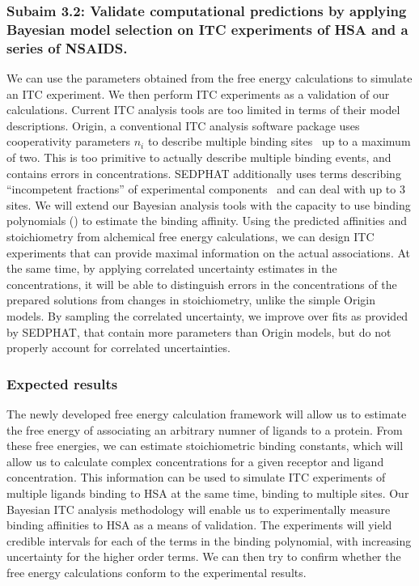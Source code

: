 \documentclass[10pt,final]{article}
\begin{document}
\subsubsection*{Subaim 3.2: Validate computational predictions by applying Bayesian model selection on ITC  experiments of HSA and a series of NSAIDS.}
We can use the parameters obtained from the free energy calculations to simulate an ITC experiment.
%
We then perform ITC experiments as a validation of our calculations.
%
Current ITC analysis tools are too limited in terms of their model descriptions.
%
Origin, a conventional ITC analysis software package uses cooperativity parameters $n_i$ to describe multiple binding sites~\autocite{MicroCal2004a} up to a maximum of two.
%
This is too primitive to actually describe multiple binding events, and contains errors in concentrations.
%
SEDPHAT additionally uses terms describing ``incompetent fractions'' of experimental components~\autocite{Houtman2007a,Zhao2015b} and can deal with up to 3 sites.
%
We will extend our Bayesian analysis tools with the capacity to use binding polynomials () to estimate the binding affinity.
%
Using the predicted affinities and stoichiometry from alchemical free energy calculations, we can design ITC experiments that can provide maximal information on the actual associations. 
%
At the same time, by applying correlated uncertainty estimates in the concentrations, it will be able to distinguish errors in the concentrations of the prepared solutions from changes in stoichiometry, unlike the simple Origin models.
%
By sampling the correlated uncertainty, we improve over fits as provided by SEDPHAT, that contain more parameters than Origin models, but do not properly account for correlated uncertainties.

\subsubsection*{Expected results}
The newly developed free energy calculation framework will allow us to estimate the free energy of associating an arbitrary numner of ligands to a protein.
%
From these free energies, we can estimate stoichiometric binding constants, which will allow us to calculate complex concentrations for a given receptor and ligand concentration.
%
This information can be used to simulate ITC experiments of multiple ligands binding to HSA at the same time, binding to multiple sites.
%
Our Bayesian ITC analysis methodology will enable us to experimentally measure binding affinities to HSA as a means of validation.
%
The experiments will yield credible intervals for each of the terms in the binding polynomial, with increasing uncertainty for the higher order terms.
%
We can then try to confirm whether the free energy calculations conform to the experimental results.
\end{document}
